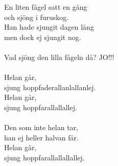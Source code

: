 
            En liten fågel satt en gång \\
            och sjöng i furuskog. \\
            Han hade sjungit dagen lång \\
            men dock ej sjungit nog. \\
\hspace{10mm} \\
            Vad sjöng den lilla fågeln då? JO!!! \\
\hspace{10mm} \\
            Helan går, \\
            sjung hoppfaderallanlallanlej. \\
            Helan går, \\
            sjung hoppfarallallallej. \\
\hspace{10mm} \\
            Den som inte helan tar, \\
            han ej heller halvan får. \\
            Helan går, \\
            sjung hoppfarallallallallej. \\
